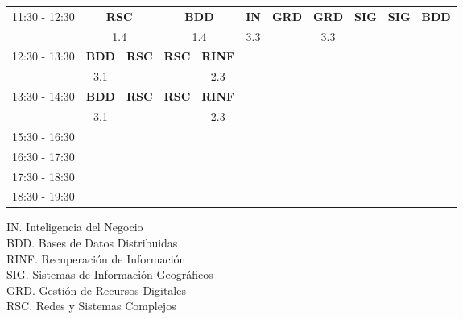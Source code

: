 \documentclass[10pt,spanish, landscape]{article}
\begin{document}
\begin{minipage}{0.7\textwidth}
\begin{tabular}{|c|cc|cc|cc|cc|cc|}
 \hline
\multirow{2}{*}{11:30 - 12:30} & \multicolumn{2}{|c|}{ \cellcolor{grisclaro} \textbf{RSC}}& \multicolumn{2}{|c|}{ \cellcolor{grisclaro} \textbf{BDD}} & \textbf{IN} & \textbf{GRD} & \textbf{GRD} & \textbf{SIG} & \textbf{SIG} & \textbf{BDD}\\ 
& \multicolumn{2}{|c|}{ \cellcolor{grisclaro} {\footnotesize 1.4}}& \multicolumn{2}{|c|}{ \cellcolor{grisclaro} {\footnotesize 1.4}} & {\footnotesize 3.3} & {\footnotesize  } & {\footnotesize 3.3} & {\footnotesize  } & {\footnotesize  } & {\footnotesize  }\\ 
 \hline
\multirow{2}{*}{12:30 - 13:30}  & \textbf{BDD} & \textbf{RSC} & \textbf{RSC} & \textbf{RINF} & \textbf{} & \textbf{} & \textbf{} & \textbf{} & \textbf{} & \textbf{}\\ 
 & {\footnotesize 3.1} & {\footnotesize  } & {\footnotesize  } & {\footnotesize 2.3} & {\footnotesize  } & {\footnotesize  } & {\footnotesize  } & {\footnotesize  } & {\footnotesize  } & {\footnotesize  }\\ 
 \hline
\multirow{2}{*}{13:30 - 14:30}  & \textbf{BDD} & \textbf{RSC} & \textbf{RSC} & \textbf{RINF} & \textbf{} & \textbf{} & \textbf{} & \textbf{} & \textbf{} & \textbf{}\\ 
 & {\footnotesize 3.1} & {\footnotesize  } & {\footnotesize  } & {\footnotesize 2.3} & {\footnotesize  } & {\footnotesize  } & {\footnotesize  } & {\footnotesize  } & {\footnotesize  } & {\footnotesize  }\\ 
 \hline
\multirow{2}{*}{15:30 - 16:30}  &  &  &  &  &  &  &  &  &  & \\ 
 &  &  &  &  &  &  &  &  &  & \\ 
 \hline
\multirow{2}{*}{16:30 - 17:30}  &  &  &  &  &  &  &  &  &  & \\ 
 &  &  &  &  &  &  &  &  &  & \\ 
 \hline
\multirow{2}{*}{17:30 - 18:30}  &  &  &  &  &  &  &  &  &  & \\ 
 &  &  &  &  &  &  &  &  &  & \\ 
 \hline
\multirow{2}{*}{18:30 - 19:30}  &  &  &  &  &  &  &  &  &  & \\ 
 &  &  &  &  &  &  &  &  &  & \\ 
 \hline

\end{tabular}
\end{minipage}
\begin{minipage}{0.25\textwidth}
IN. Inteligencia del Negocio\\[0.5cm]
BDD. Bases de Datos Distribuidas\\[0.5cm]
RINF. Recuperación de Información\\[0.5cm]
SIG. Sistemas de Información Geográficos\\[0.5cm]
GRD. Gestión de Recursos Digitales\\[0.5cm]
RSC. Redes y Sistemas Complejos\\[0.5cm]
\end{minipage}
\newpage
\end{document}
